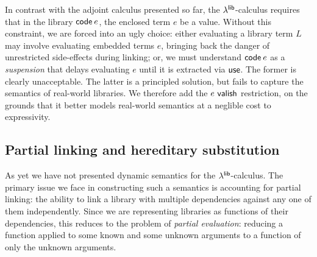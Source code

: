 \documentclass[11pt]{article}
\begin{document}
In contrast with the adjoint calculus presented so far, the $\lambda^{\textsf{lib}}$-calculus
requires that in the library $\textsf{code}\:{e}$, the enclosed term $e$ be a value.
Without this constraint, we are forced into an ugly choice: either evaluating a
library term $L$ may involve evaluating embedded terms $e$, bringing back the
danger of unrestricted side-effects during linking; or, we must understand
$\textsf{code}\:{e}$ as a \emph{suspension} that delays evaluating $e$ until it is
extracted via $\textsf{use}$. The former is clearly unacceptable. The latter is a
principled solution, but fails to capture the semantics of real-world libraries.
We therefore add the $e ~\textsf{valish}$ restriction, on the grounds that it better
models real-world semantics at a neglible cost to expressivity.


\subsection{Partial linking and hereditary substitution}

As yet we have not presented dynamic semantics for the $\lambda^{\textsf{lib}}$-calculus. The
primary issue we face in constructing such a semantics is accounting for partial
linking: the ability to link a library with multiple dependencies against any
one of them independently. Since we are representing libraries as functions of
their dependencies, this reduces to the problem of \emph{partial evaluation}:
reducing a function applied to some known and some unknown arguments to a
function of only the unknown arguments.



\end{document}
